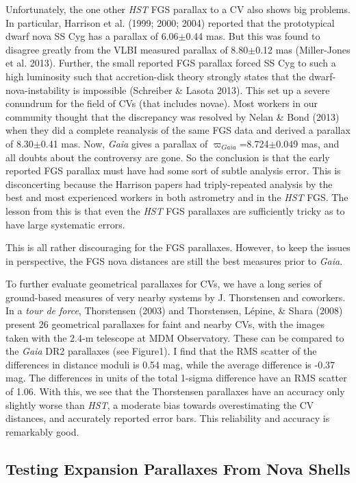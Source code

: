\documentclass[a4paper,fleqn,usenatbib]{mnras}
\begin{document}
Unfortunately, the one other {\it HST} FGS parallax to a CV also shows big problems.  In particular, Harrison et al. (1999; 2000; 2004) reported that the prototypical dwarf nova SS Cyg has a parallax of 6.06$\pm$0.44 mas.  But this was found to disagree greatly from the VLBI measured parallax of 8.80$\pm$0.12 mas (Miller-Jones et al. 2013).  Further, the small reported FGS parallax forced SS Cyg to such a high luminosity such that accretion-disk theory strongly states that the dwarf-nova-instability is impossible (Schreiber \& Lasota 2013).  This set up a severe conundrum for the field of CVs (that includes novae).  Most workers in our community thought that the discrepancy was resolved by Nelan \& Bond (2013) when they did a complete reanalysis of the same FGS data and derived a parallax of 8.30$\pm$0.41 mas.  Now, {\it Gaia} gives a parallax of $\varpi_{Gaia}$=8.724$\pm$0.049 mas, and all doubts about the controversy are gone.  So the conclusion is that the early reported FGS parallax must have had some sort of subtle analysis error.  This is disconcerting because the Harrison papers had triply-repeated analysis by the best and most experienced workers in both astrometry and in the {\it HST} FGS.  The lesson from this is that even the {\it HST} FGS parallaxes are sufficiently tricky as to have large systematic errors.

This is all rather discouraging for the FGS parallaxes.  However, to keep the issues in perspective, the FGS nova distances are still the best measures prior to {\it Gaia}.

To further evaluate geometrical parallaxes for CVs, we have a long series of ground-based measures of very nearby systems by J. Thorstensen and coworkers.  In a {\it tour de force}, Thorstensen (2003) and Thorstensen, L\'{e}pine, \& Shara (2008) present 26 geometrical parallaxes for faint and nearby CVs, with the images taken with the 2.4-m telescope at MDM Observatory.  These can be compared to the {\it Gaia} DR2 parallaxes (see Figure1).  I find that the RMS scatter of the differences in distance moduli is 0.54 mag, while the average difference is -0.37 mag.  The differences in units of the total 1-sigma difference have an RMS scatter of 1.06.  With this, we see that the Thorstensen parallaxes have an accuracy only slightly worse than {\it HST}, a moderate bias towards overestimating the CV distances, and accurately reported error bars.  This reliability and accuracy is remarkably good.

\subsection{Testing Expansion Parallaxes From Nova Shells}
\end{document}
